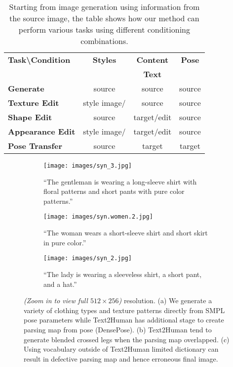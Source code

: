 \documentclass[10pt,twocolumn,letterpaper]{article}
\begin{document}
\begin{table}[]
\begin{center}
\begin{tabular}{l|c|c|c} 
\toprule
\textbf{Task\textbackslash Condition}  & \textbf{Styles} & \textbf{Content} & \textbf{Pose} \\
& &\textbf{Text} & \\
\toprule
\textbf{Generate} & source & source & source \\
\textbf{Texture Edit}  & style image/ & source & source \\
\textbf{Shape Edit}  & source &  target/edit & source \\
\textbf{Appearance Edit}  & style image/  & target/edit & source \\
\textbf{Pose Transfer}  & source & target & target  \\
\bottomrule
\end{tabular}
\caption{Starting from image generation using information from the source image, the table shows how our method can perform various tasks using different conditioning combinations.}
\label{table:edit}
\end{center}
\end{table}
\vspace{-4mm}
\begin{figure*}[ht]
\centering
    \begin{subfigure}[b]{0.8\textwidth}
    \texttt{[image: images/syn\_3.jpg]}
    \caption{``The gentleman is wearing a long-sleeve shirt with floral patterns and short pants with pure color patterns.''}
    \label{fig:synthesis_man}
    \end{subfigure}    
    \begin{subfigure}[b]{0.8\textwidth}
    \texttt{[image: images/syn.women.2.jpg]}
    \caption{``The woman wears a short-sleeve shirt and short skirt in pure color.''}
    \label{fig:synthesis_leg}    
    \end{subfigure}
    \begin{subfigure}[b]{0.8\textwidth}
    \texttt{[image: images/syn\_2.jpg]}
    \caption{``The lady is wearing a sleeveless shirt, a short pant, and a hat.''}
    \label{fig:ssynthesis_pant}
    \end{subfigure}      
\caption{\textit{(Zoom in to view full $512\times256$)} resolution. (a) We generate a variety of clothing types and texture patterns directly from SMPL pose parameters while Text2Human has additional stage to create parsing map from pose (DensePose\cite{densepose}). (b) Text2Human tend to generate blended crossed legs when the parsing map overlapped. (c) Using vocabulary outside of Text2Human limited dictionary can result in defective parsing map and hence erroneous final image.}
\label{fig:synthesis}
\end{figure*}
\end{document}
